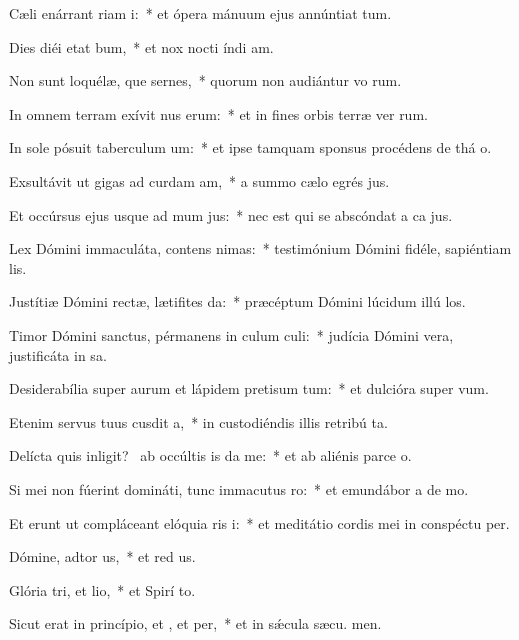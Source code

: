 \item Cæli enárrant riam i:~* et ópera mánuum ejus annúntiat tum.
\item Dies diéi etat bum,~* et nox nocti índi am.
\item Non sunt loquélæ, que sernes,~* quorum non audiántur vo rum.
\item In omnem terram exívit nus erum:~* et in fines orbis terræ ver rum.
\item In sole pósuit taberculum um:~* et ipse tamquam sponsus procédens de thá o.
\item Exsultávit ut gigas ad curdam am,~* a summo cælo egrés jus.
\item Et occúrsus ejus usque ad mum jus:~* nec est qui se abscóndat a ca jus.
\item Lex Dómini immaculáta, contens nimas:~* testimónium Dómini fidéle, sapiéntiam  lis.
\item Justítiæ Dómini rectæ, lætifites da:~* præcéptum Dómini lúcidum illú los.
\item Timor Dómini sanctus, pérmanens in culum culi:~* judícia Dómini vera, justificáta in sa.
\item Desiderabília super aurum et lápidem pretisum tum:~* et dulcióra super   vum.
\item Etenim servus tuus cusdit a,~* in custodiéndis illis retribú ta.
\item Delícta quis inligit?~\pscross{} ab occúltis is da me:~* et ab aliénis parce  o.
\item Si mei non fúerint domináti, tunc immacutus ro:~* et emundábor a de mo.
\item Et erunt ut compláceant elóquia ris i:~* et meditátio cordis mei in conspéctu  per.
\item Dómine, adtor us,~* et red us.
\item Glória tri, et lio,~* et Spirí to.
\item Sicut erat in princípio, et , et per,~* et in sǽcula sæcu. men.

